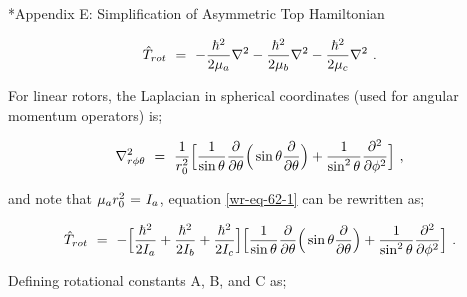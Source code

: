 \documentclass[11pt]{article}
\makeatletter
\let\workreportsection\section
\renewcommand{\section}{\@ifstar{\workreportstarsection}{\workreportsection}}
\newcommand{\workreportstarsection}[1]{\workreportsection*{#1}\addcontentsline{toc}{section}{#1}}
\makeatother
\begin{document}
\hypertarget{wr-appendix-e}{}
\section*{Appendix E: Simplification of Asymmetric Top Hamiltonian}
\label{wr-app-Eappx-1}

\begin{equation} \label{wr-eq-62-1}
\hat{T}_{rot} \hspace{0.125cm} = \hspace{0.125cm} - \frac{\hbar^2}{2 \mu_{a}} \nabla^2 - \frac{\hbar^2}{2 \mu_{b}} \nabla^2 - \frac{\hbar^2}{2 \mu_{c}} \nabla^2 \hspace{0.125cm} .
\end{equation}

For linear rotors, the Laplacian in spherical coordinates (used for angular momentum operators) is;

\begin{equation} \label{wr-eq-63-1}
\nabla^{2}_{r \phi \theta} \hspace{0.125cm} = \hspace{0.125cm} \frac{1}{r^2_0} \Big[ \frac{1}{\sin{\theta}} \frac{\partial}{\partial{\theta}} \Big( \sin{\theta} \frac{\partial}{\partial{\theta}} \Big) + \frac{1}{\sin^2 \theta} \frac{\partial^2}{\partial{\phi}^2} \Big] \hspace{0.125cm} ,
\end{equation}

and note that \begin{math} \mu_a r^2_0 \hspace{0.025cm} = \hspace{0.025cm} I_a \end{math}, equation \ref{wr-eq-62-1} can be rewritten as;

\vspace{-0.25cm}

\begin{equation} \label{wr-eq-64-1}
\hat{T}_{rot} \hspace{0.125cm} = \hspace{0.125cm} - \Big[ \frac{\hbar^2}{2 I_{a}} + \frac{\hbar^2}{2 I_{b}} + \frac{\hbar^2}{2 I_{c}} \Big] \Big[ \frac{1}{\sin{\theta}} \frac{\partial}{\partial{\theta}} \Big( \sin{\theta} \frac{\partial}{\partial{\theta}} \Big) + \frac{1}{\sin^2 \theta} \frac{\partial^2}{\partial{\phi}^2} \Big] \hspace{0.125cm} .
\end{equation}

Defining rotational constants A, B, and C as;
\end{document}

